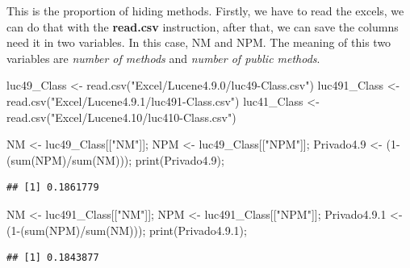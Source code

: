 \documentclass[
]{article}
\newenvironment{Shaded}{\begin{snugshade}}{\end{snugshade}}
\newcommand{\DecValTok}[1]{\textcolor[rgb]{0.00,0.00,0.81}{#1}}
\newcommand{\FloatTok}[1]{\textcolor[rgb]{0.00,0.00,0.81}{#1}}
\newcommand{\FunctionTok}[1]{\textcolor[rgb]{0.00,0.00,0.00}{#1}}
\newcommand{\NormalTok}[1]{#1}
\newcommand{\OtherTok}[1]{\textcolor[rgb]{0.56,0.35,0.01}{#1}}
\newcommand{\SpecialCharTok}[1]{\textcolor[rgb]{0.00,0.00,0.00}{#1}}
\newcommand{\StringTok}[1]{\textcolor[rgb]{0.31,0.60,0.02}{#1}}
\begin{document}
This is the proportion of hiding methods. Firstly, we have to read the
excels, we can do that with the \textbf{read.csv} instruction, after
that, we can save the columns need it in two variables. In this case, NM
and NPM. The meaning of this two variables are \emph{number of methods}
and \emph{number of public methods}.

\begin{Shaded}
\begin{Highlighting}[]
\NormalTok{luc49\_Class  }\OtherTok{\textless{}{-}} \FunctionTok{read.csv}\NormalTok{(}\StringTok{"Excel/Lucene4.9.0/luc49{-}Class.csv"}\NormalTok{) }
\NormalTok{luc491\_Class  }\OtherTok{\textless{}{-}} \FunctionTok{read.csv}\NormalTok{(}\StringTok{"Excel/Lucene4.9.1/luc491{-}Class.csv"}\NormalTok{) }
\NormalTok{luc41\_Class  }\OtherTok{\textless{}{-}} \FunctionTok{read.csv}\NormalTok{(}\StringTok{"Excel/Lucene4.10/luc410{-}Class.csv"}\NormalTok{) }

\NormalTok{NM }\OtherTok{\textless{}{-}}\NormalTok{ luc49\_Class[[}\StringTok{"NM"}\NormalTok{]];}
\NormalTok{NPM }\OtherTok{\textless{}{-}}\NormalTok{ luc49\_Class[[}\StringTok{"NPM"}\NormalTok{]];}
\NormalTok{Privado4}\FloatTok{.9} \OtherTok{\textless{}{-}}\NormalTok{ (}\DecValTok{1}\SpecialCharTok{{-}}\NormalTok{(}\FunctionTok{sum}\NormalTok{(NPM)}\SpecialCharTok{/}\FunctionTok{sum}\NormalTok{(NM)));}
\FunctionTok{print}\NormalTok{(Privado4}\FloatTok{.9}\NormalTok{);}
\end{Highlighting}
\end{Shaded}

\begin{verbatim}
## [1] 0.1861779
\end{verbatim}

\begin{Shaded}
\begin{Highlighting}[]
\NormalTok{NM }\OtherTok{\textless{}{-}}\NormalTok{ luc491\_Class[[}\StringTok{"NM"}\NormalTok{]];}
\NormalTok{NPM }\OtherTok{\textless{}{-}}\NormalTok{ luc491\_Class[[}\StringTok{"NPM"}\NormalTok{]];}
\NormalTok{Privado4.}\FloatTok{9.1} \OtherTok{\textless{}{-}}\NormalTok{ (}\DecValTok{1}\SpecialCharTok{{-}}\NormalTok{(}\FunctionTok{sum}\NormalTok{(NPM)}\SpecialCharTok{/}\FunctionTok{sum}\NormalTok{(NM)));}
\FunctionTok{print}\NormalTok{(Privado4.}\FloatTok{9.1}\NormalTok{);}
\end{Highlighting}
\end{Shaded}

\begin{verbatim}
## [1] 0.1843877
\end{verbatim}
\end{document}
